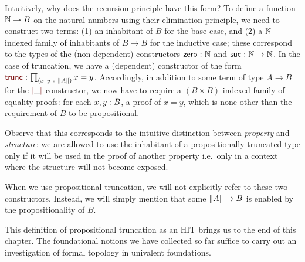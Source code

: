 Intuitively, why does the recursion principle have this form? To define a function
$\mathbb{N}{} \rightarrow B$ on the natural numbers using their elimination principle, we need to
construct two terms: (1) an inhabitant of $B$ for the base case, and (2) a
$\mathbb{N}{}$-indexed family of inhabitants of $B \rightarrow B$ for the inductive case; these
correspond to the types of the (non-dependent) constructors $\mathsf{zero}{}\hspace{0.1mm}:\hspace{0.1mm}\mathbb{N}{}$ and
$\mathsf{suc}{}\hspace{0.1mm}:\hspace{0.1mm}\mathbb{N}{} \rightarrow \mathbb{N}{}$. In the case of truncation, we have a (dependent)
constructor of the form $\oftyI{\rulename{trunc}}{\pity{x~y}{\trunc{A}}{x = y}}$.
Accordingly, in addition to some term of type $A \rightarrow B$ for the $\rulename{|}\_\rulename{|}$
constructor, we now have to require a $(B \times B)$-indexed family of equality proofs: for
each $x, y:B$, a proof of $x = y$, which is none other than the requirement of
$B$ to be propositional.

Observe that this corresponds to the intuitive distinction between \emph{property} and
\emph{structure}: we are allowed to use the inhabitant of a propositionally truncated type
only if it will be used in the proof of another property i.e.~only in a context where the
structure will not become exposed.

When we use propositional truncation, we will not explicitly refer to these two
constructors. Instead, we will simply mention that some $\left\| A \right\| \rightarrow B$ is enabled by the
propositionality of $B$.

This definition of propositional truncation as an HIT brings us to the end of this
chapter. The foundational notions we have collected so far suffice to carry out an
investigation of formal topology in univalent foundations.
